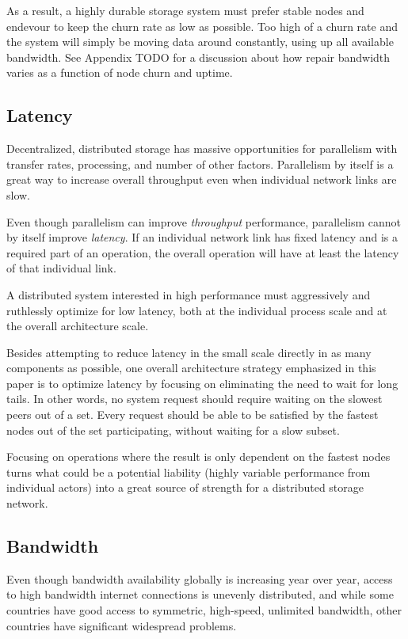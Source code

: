 \documentclass[a4paper,10pt]{article}
\newcommand{\todo}[1]{{\color{red} TODO #1}}
\begin{document}
As a result, a highly durable storage system must prefer stable nodes and
endevour to keep the churn rate as low as possible. Too high of a churn rate
and the system will simply be moving data around constantly, using up all
available bandwidth. See Appendix \todo{} for a discussion about how repair
bandwidth varies as a function of node churn and uptime.

\subsection{Latency}

Decentralized, distributed storage has massive opportunities for parallelism
with transfer rates, processing, and number of other factors. Parallelism by
itself is a great way to increase overall throughput even when individual
network links are slow.

Even though parallelism can improve {\em throughput} performance, parallelism
cannot by itself improve {\em latency}. If an individual network link has fixed
latency and is a required part of an operation, the overall operation will
have at least the latency of that individual link.

A distributed system interested in high performance must aggressively and
ruthlessly optimize for low latency, both at the individual process scale and
at the overall architecture scale.

Besides attempting to reduce latency in the small scale directly in as many
components as possible, one overall architecture strategy emphasized in this
paper is to optimize latency by focusing on eliminating the need to wait for
long tails.\cite{tail-at-scale} In other words, no system request should require
waiting on the slowest peers out of a set. Every request should be able to be
satisfied by the fastest nodes out of the set participating, without waiting
for a slow subset.

Focusing on operations where the result is only dependent on the fastest nodes
turns what could be a potential liability (highly variable performance from
individual actors) into a great source of strength for a distributed storage
network.

\subsection{Bandwidth}

Even though bandwidth availability globally is increasing year over year, access
to high bandwidth internet connections is unevenly distributed, and while some
countries have good access to symmetric, high-speed, unlimited bandwidth, other
countries have significant widespread problems.
\end{document}
